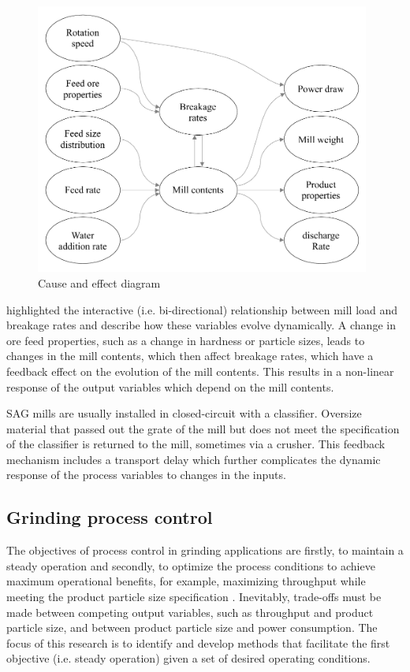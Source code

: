 \begin{figure}[htp]
	\centering
	\includegraphics[width=11cm]{images/cause-effect.pdf}
	\caption{Cause and effect diagram} \label{fig:cause-effect}
\end{figure}

\cite{powell_applying_2009} highlighted the interactive (i.e. bi-directional) relationship between mill load and breakage rates and describe how these variables evolve dynamically. A change in ore feed properties, such as a change in hardness or particle sizes, leads to changes in the mill contents, which then affect breakage rates, which have a feedback effect on the evolution of the mill contents. This results in a non-linear response of the output variables which depend on the mill contents.

SAG mills are usually installed in closed-circuit with a classifier. Oversize material that passed out the grate of the mill but does not meet the specification of the classifier is returned to the mill, sometimes via a crusher. This feedback mechanism includes a transport delay which further complicates the dynamic response of the process variables to changes in the inputs.

\subsection*{Grinding process control}

The objectives of process control in grinding applications are firstly, to maintain a steady operation and secondly, to optimize the process conditions to achieve maximum operational benefits, for example, maximizing throughput while meeting the product particle size specification \citep{wei_grinding_2009}. Inevitably, trade-offs must be made between competing output variables, such as throughput and product particle size, and between product particle size and power consumption. The focus of this research is to identify and develop methods that facilitate the first objective (i.e. steady operation) given a set of desired operating conditions.

